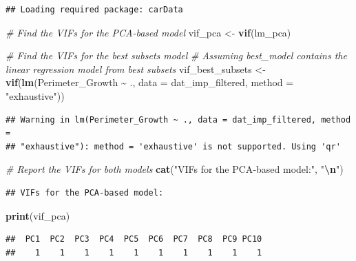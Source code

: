 \documentclass[
]{article}
\newenvironment{Shaded}{\begin{snugshade}}{\end{snugshade}}
\newcommand{\AttributeTok}[1]{\textcolor[rgb]{0.13,0.29,0.53}{#1}}
\newcommand{\CommentTok}[1]{\textcolor[rgb]{0.56,0.35,0.01}{\textit{#1}}}
\newcommand{\FunctionTok}[1]{\textcolor[rgb]{0.13,0.29,0.53}{\textbf{#1}}}
\newcommand{\NormalTok}[1]{#1}
\newcommand{\OtherTok}[1]{\textcolor[rgb]{0.56,0.35,0.01}{#1}}
\newcommand{\SpecialCharTok}[1]{\textcolor[rgb]{0.81,0.36,0.00}{\textbf{#1}}}
\newcommand{\StringTok}[1]{\textcolor[rgb]{0.31,0.60,0.02}{#1}}
\begin{document}
\begin{verbatim}
## Loading required package: carData
\end{verbatim}

\begin{Shaded}
\begin{Highlighting}[]
\CommentTok{\# Find the VIFs for the PCA{-}based model}
\NormalTok{vif\_pca }\OtherTok{\textless{}{-}} \FunctionTok{vif}\NormalTok{(lm\_pca)}

\CommentTok{\# Find the VIFs for the best subsets model}
\CommentTok{\# Assuming \textquotesingle{}best\_model\textquotesingle{} contains the linear regression model from best subsets}
\NormalTok{vif\_best\_subsets }\OtherTok{\textless{}{-}} \FunctionTok{vif}\NormalTok{(}\FunctionTok{lm}\NormalTok{(Perimeter\_Growth }\SpecialCharTok{\textasciitilde{}}\NormalTok{ ., }\AttributeTok{data =}\NormalTok{ dat\_imp\_filtered, }\AttributeTok{method =} \StringTok{"exhaustive"}\NormalTok{))}
\end{Highlighting}
\end{Shaded}

\begin{verbatim}
## Warning in lm(Perimeter_Growth ~ ., data = dat_imp_filtered, method =
## "exhaustive"): method = 'exhaustive' is not supported. Using 'qr'
\end{verbatim}

\begin{Shaded}
\begin{Highlighting}[]
\CommentTok{\# Report the VIFs for both models}
\FunctionTok{cat}\NormalTok{(}\StringTok{"VIFs for the PCA{-}based model:"}\NormalTok{, }\StringTok{"}\SpecialCharTok{\textbackslash{}n}\StringTok{"}\NormalTok{)}
\end{Highlighting}
\end{Shaded}

\begin{verbatim}
## VIFs for the PCA-based model:
\end{verbatim}

\begin{Shaded}
\begin{Highlighting}[]
\FunctionTok{print}\NormalTok{(vif\_pca)}
\end{Highlighting}
\end{Shaded}

\begin{verbatim}
##  PC1  PC2  PC3  PC4  PC5  PC6  PC7  PC8  PC9 PC10 
##    1    1    1    1    1    1    1    1    1    1
\end{verbatim}
\end{document}
